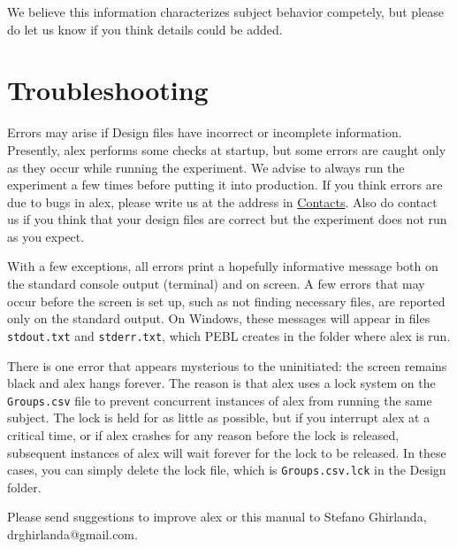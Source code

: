 \documentclass[11pt,]{article}
\begin{document}
We believe this information characterizes subject behavior competely,
but please do let us know if you think details could be added.

\section{Troubleshooting}

Errors may arise if Design files have incorrect or incomplete
information. Presently, alex performs some checks at startup, but some
errors are caught only as they occur while running the experiment. We
advise to always run the experiment a few times before putting it into
production. If you think errors are due to bugs in alex, please write us
at the address in \hyperref[contacts]{Contacts}. Also do contact us if
you think that your design files are correct but the experiment does not
run as you expect.

With a few exceptions, all errors print a hopefully informative message
both on the standard console output (terminal) and on screen. A few
errors that may occur before the screen is set up, such as not finding
necessary files, are reported only on the standard output. On Windows,
these messages will appear in files \texttt{stdout.txt} and
\texttt{stderr.txt}, which PEBL creates in the folder where alex is run.

There is one error that appears mysterious to the uninitiated: the
screen remains black and alex hangs forever. The reason is that alex
uses a lock system on the \texttt{Groups.csv} file to prevent concurrent
instances of alex from running the same subject. The lock is held for as
little as possible, but if you interrupt alex at a critical time, or if
alex crashes for any reason before the lock is released, subsequent
instances of alex will wait forever for the lock to be released. In
these cases, you can simply delete the lock file, which is
\texttt{Groups.csv.lck} in the Design folder.


Please send suggestions to improve alex or this manual to Stefano
Ghirlanda, drghirlanda@gmail.com.
\end{document}
